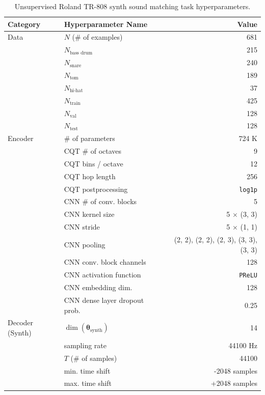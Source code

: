 \documentclass{article} %
\theoremstyle{plain}
\theoremstyle{definition}
\theoremstyle{remark}
\begin{document}
\begin{table}[H]
\centering
\caption{Unsupervised Roland TR-808 synth sound matching task hyperparameters.}
\label{tab:808_hyperparams}
\vspace{3pt}
\begin{tabular}{
    llr
}
    \toprule
    \bf{Category} & \bf{Hyperparameter Name} & \bf{Value} \\
    \midrule
    Data & $N$ (\# of examples) & 681 \\
    & $N_{\text{bass drum}}$ & 215 \\
    & $N_{\text{snare}}$ & 240 \\
    & $N_{\text{tom}}$ & 189 \\
    & $N_{\text{hi-hat}}$ & 37 \\
    & $N_{\text{train}}$ & 425 \\
    & $N_{\text{val}}$ & 128 \\
    & $N_{\text{test}}$ & 128 \\
    \midrule
    Encoder & \# of parameters & 724 K \\
    & CQT \# of octaves & 9 \\
    & CQT bins / octave & 12 \\
    & CQT hop length & 256 \\
    & CQT postprocessing & \texttt{log1p} \\
    & CNN \# of conv. blocks & 5 \\
    & CNN kernel size & 5 $\times$ (3, 3) \\
    & CNN stride & 5 $\times$ (1, 1) \\
    & CNN pooling & (2, 2), (2, 2), (2, 3), (3, 3), (3, 3) \\
    & CNN conv. block channels & 128 \\
    & CNN activation function & \texttt{PReLU} \\
    & CNN embedding dim. & 128 \\
    & CNN dense layer dropout prob. & 0.25 \\
    \midrule
    Decoder (Synth) & $\dim(\boldsymbol{\theta_{\mathrm{synth}}})$ & 14 \\
    & sampling rate & 44100 Hz \\
    & $T$ (\# of samples) & 44100 \\
    & min. time shift & -2048 samples \\
    & max. time shift & +2048 samples \\

\end{tabular}
\end{table}
\end{document}
